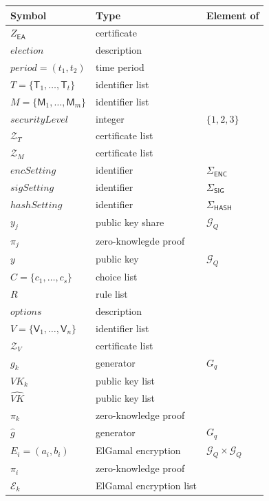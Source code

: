 \documentclass[bibtotoc,halfparskip,oneside]{scrreprt}
\newcommand{\descrElection}{\mathit{election}\xspace}
\newcommand{\descrOptions}{\mathit{options}\xspace}
\newcommand{\period}{\mathit{period}\xspace}
\newcommand{\security}{\mathit{securityLevel}\xspace}
\newcommand{\EA}{\ensuremath{\mathsf{EA}}\xspace}
\newcommand{\Tallier}[1]{\ensuremath{\mathsf{T}_{#1}}\xspace}
\newcommand{\Mixer}[1]{\ensuremath{\mathsf{M}_{#1}}\xspace}
\newcommand{\Voter}[1]{\ensuremath{\mathsf{V}_{#1}}\xspace}
\begin{document}
	\begin{table}[ht]
		\begin{center}
			\begin{tabular}{l|l|l}
				Symbol & Type  & Element of \\\hline
				$Z_{\EA}$ & certificate & \\
				$\descrElection$ & description & \\
				$\period=(t_{1},t_{2})$ & time period & \\
				$T=\{\Tallier{1},\ldots,\Tallier{t}\}$ & identifier list & \\
				$M=\{\Mixer{1},\ldots,\Mixer{m}\}$ & identifier list & \\
				$\security$ & integer & $\{1,2,3\}$\\
				$\mathcal{Z}_{T}$ & certificate list & \\
				$\mathcal{Z}_{M}$ & certificate list & \\
				$\mathit{encSetting}$ & identifier & $\Sigma_\mathsf{ENC}$\\
				$\mathit{sigSetting}$ & identifier & $\Sigma_\mathsf{SIG}$\\
				$\mathit{hashSetting}$ & identifier & $\Sigma_\mathsf{HASH}$\\
				$y_j$ & public key share & $\mathcal{G}_Q$\\
				$\pi_j$ & zero-knowlegde proof & \\
				$y$ & public key & $\mathcal{G}_Q$ \\
				$C=\{c_1,\ldots,c_s\}$ & choice list & \\
				$R$ & rule list &  \\
				$\descrOptions$ & description & \\
				$V=\{\Voter{1},\ldots,\Voter{n}\}$ & identifier list & \\
				$\mathcal{Z}_{V}$ & certificate list & \\
				$g_k$ & generator & $G_q$ \\
				$\mathit{VK}_k$ & public key list & \\
				$\hat{\mathit{VK}}$  & public key list & \\
				$\pi_k$ & zero-knowledge proof & \\
				$\hat{g}$ & generator & $G_q$ \\
				$E_i=(a_i,b_i)$ & ElGamal encryption & $\mathcal{G}_Q\times\mathcal{G}_Q$\\
				$\pi_i$ & zero-knowledge proof & \\
				$\mathcal{E}_k$ & ElGamal encryption list & \\

\end{tabular}
\end{center}
\end{table}
\end{document}
